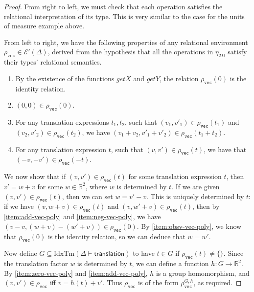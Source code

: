 \documentclass[natbib,preprint]{sigplanconf}
\newcommand{\idxTms}[2]{\mathrm{IdxTm}(#1 \vdash #2)}
\newcommand{\tyPrimNm}[1]{\texttt{#1}}
\newcommand{\relEnv}[1]{\mathcal{#1}}
\begin{document}
\begin{proof}
  From right to left, we must check that each operation satisfies the
  relational interpretation of its type. This is very similar to the
  case for the units of measure example above.

  From left to right, we have the following properties of any
  relational environment $\rho_{\tyPrimNm{vec}} \in
  \relEnv{E}'(\Delta)$, derived from the hypothesis that all the
  operations in $\eta_{\mathit{2D}}$ satisfy their types'
  relational semantics.
  \begin{enumerate}
  \item\label{item:obsv-vec-poly} By the existence of the functions
    $\mathit{getX}$ and $\mathit{getY}$, the relation
    $\rho_{\tyPrimNm{vec}}(0)$ is the identity relation.
  \item \label{item:zero-vec-poly} $(0,0) \in \rho_{\tyPrimNm{vec}}(0)$.
  \item \label{item:add-vec-poly} For any translation expressions $t_1,t_2$,
    such that $(v_1,v'_1) \in \rho_{\tyPrimNm{vec}}(t_1)$ and
    $(v_2,v'_2) \in \rho_{\tyPrimNm{vec}}(t_2)$, we have $(v_1 + v_2,
    v'_1 + v'_2) \in \rho_{\tyPrimNm{vec}}(t_1 + t_2)$.
  \item\label{item:neg-vec-poly} For any translation expression $t$,
    such that $(v,v') \in \rho_{\tyPrimNm{vec}}(t)$, we have that
    $(-v,-v') \in \rho_{\tyPrimNm{vec}}(-t)$.
  \end{enumerate}
  We now show that if $(v,v') \in \rho_{\tyPrimNm{vec}}(t)$ for some
  translation expression $t$, then $v' = w + v$ for some $w \in
  \mathbb{R}^2$, where $w$ is determined by $t$. If we are given
  $(v,v') \in \rho_{\tyPrimNm{vec}}(t)$, then we can set $w = v' -
  v$. This is uniquely determined by $t$: if we have $(v, w + v) \in
  \rho_{\tyPrimNm{vec}}(t)$ and $(v, w' + v) \in
  \rho_{\tyPrimNm{vec}}(t)$, then by \ref{item:add-vec-poly} and
  \ref{item:neg-vec-poly}, we have $(v - v, (w + v) - (w' + v)) \in
  \rho_{\tyPrimNm{vec}}(0)$. By \ref{item:obsv-vec-poly}, we know that
  $\rho_{\tyPrimNm{vec}}(0)$ is the identity relation, so we can
  deduce that $w = w'$.

  Now define $G \subseteq \idxTms{\Delta}{\mathsf{translation}}$ to
  have $t \in G$ if $\rho_{\tyPrimNm{vec}}(t) \not= \{\}$. Since the
  translation factor $w$ is determined by $t$, we can define a
  function $h : G \to \mathbb{R}^2$. By \ref{item:zero-vec-poly} and
  \ref{item:add-vec-poly}, $h$ is a group homomorphism, and $(v,v')
  \in \rho_{\tyPrimNm{vec}}$ iff $v = h(t) + v'$. Thus
  $\rho_{\tyPrimNm{vec}}$ is of the form
  $\rho^{G,h}_{\tyPrimNm{vec}}$, as required.
\end{proof}
\end{document}
